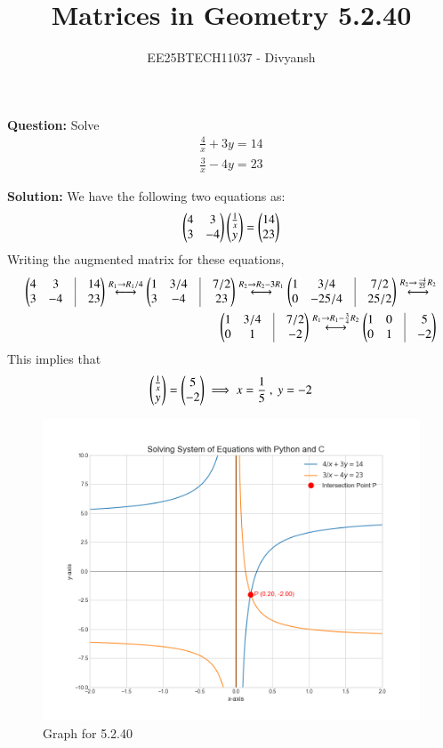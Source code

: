 \documentclass[journal,12pt,onecolumn]{IEEEtran}
\title{Matrices in Geometry 5.2.40}
\author{EE25BTECH11037 - Divyansh}
\theoremstyle{remark}
\begin{document}
\vspace{3cm}
\maketitle
{\let\newpage\relax\maketitle}
\textbf{Question: }
Solve
\begin{align*}
    \frac{4}{x}+3y=14 \\
    \frac{3}{x} -4y =23
\end{align*}

\vspace{2mm}

\textbf{Solution:}
\vspace{1mm}
We have the following two equations as:
\begin{align}
    \begin{pmatrix}4 & 3 \\ 3 & -4\end{pmatrix}\begin{pmatrix}\frac{1}{x} \\ y\end{pmatrix}=\begin{pmatrix}14 \\ 23\end{pmatrix}
\end{align}
Writing the augmented matrix for these equations,
\begin{align}
    \myvec{4 & 3 & \vrule & 14 \\ 3 & -4 & \vrule & 23} \overset{R_1 \rightarrow R_1 /4}{\longleftrightarrow} \myvec{1 & 3/4 & \vrule & 7/2 \\ 3 & -4 & \vrule & 23}\overset{R_2 \rightarrow R_2-3R_1}{\longleftrightarrow} \myvec{1 & 3/4 & \vrule & 7/2 \\ 0 & -25/4 & \vrule & 25/2} \overset{R_2 \rightarrow \frac{-4}{25}R_2}{\longleftrightarrow}\\
    \myvec{1 & 3/4 & \vrule & 7/2 \\ 0 & 1 & \vrule & -2}\overset{R_1 \rightarrow R_1-\frac{3}{4} R_2}{\longleftrightarrow} \myvec{1 & 0 & \vrule & 5 \\ 0 & 1 & \vrule & -2}
\end{align}
This implies that
\begin{align}
    \myvec{\frac{1}{x} \\ y} = \myvec{5 \\ -2}\implies x=\dfrac{1}{5} \ , \ y=-2
\end{align}
\begin{figure}[H]
    \centering
    \includegraphics[width=1\columnwidth]{figs/1.png}
    \caption{Graph for 5.2.40}
    \label{fig:placeholder}
\end{figure}
\end{document}
